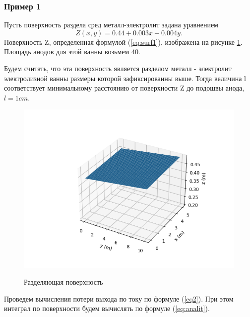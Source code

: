\documentclass{article}
\begin{document}
\subsubsection*{Пример 1}\label{ex1m}
Пусть поверхность раздела сред металл-электролит задана уравнением
\begin{equation} \label{eq:surf1}
Z(x,y) = 0.44 + 0.003x + 0.004y.
\end{equation}
Поверхность Z, определенная формулой (\ref{eq:surf1}), изображена на рисунке \ref{fig:H1Surf}. Площадь анодов для этой ванны возьмем $40$.

Будем считать, что эта поверхность является разделом металл - электролит электролизной ванны размеры которой зафиксированны выше. Тогда величина l соответствует минимальному расстоянию от поверхности Z до подошвы анода, $l=1 cm$.

\begin{figure}[H]
\centering
\includegraphics[width=0.8\linewidth]{First_surface.png}
\caption{}
\label{fig:H1Surf}
Разделяющая поверхность
\end{figure}

Проведем вычисления потери выхода по току по формуле (\ref{eq2}). При этом  интеграл по поверхности будем вычислять по формуле (\ref{eq:analit}).
\end{document}
